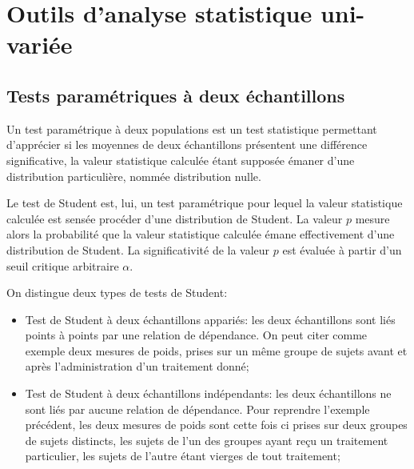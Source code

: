 \chapter{Outils d'analyse statistique uni-variée}
\label{app:statuni}


\section{Tests paramétriques à deux échantillons}
\label{app:student}

Un test paramétrique à deux populations est un test statistique permettant d'apprécier si les moyennes de deux échantillons présentent une différence significative, la valeur statistique calculée étant supposée émaner d'une distribution particulière, nommée distribution nulle. 

Le test de Student est, lui, un test paramétrique pour lequel la valeur statistique calculée est sensée procéder d'une distribution de Student. La valeur $p$ mesure alors la probabilité que la valeur statistique calculée émane effectivement d'une distribution de Student. La significativité de la valeur $p$ est évaluée à partir d'un seuil critique arbitraire $\alpha$.

On distingue deux types de tests de Student:

\begin{itemize}
\item Test de Student à deux échantillons appariés: les deux échantillons sont liés points à points par une relation de dépendance. On peut citer comme exemple deux mesures de poids, prises sur un même groupe de sujets avant et après l'administration d'un traitement donné; 
\item Test de Student à deux échantillons indépendants: les deux échantillons ne sont liés par aucune relation de dépendance. Pour reprendre l'exemple précédent, les deux mesures de poids sont cette fois ci prises sur deux groupes de sujets distincts, les sujets de l'un des groupes ayant reçu un traitement particulier, les sujets de l'autre étant vierges de tout traitement;
\end{itemize}

